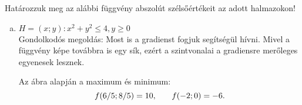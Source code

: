 \documentclass[exercise]{math-standalone}
\begin{document}
\begin{exercise}{%
    Határozzuk meg az alábbi függvény abszolút szélsőértékeit az adott
    halmazokon!
  }
{\begin{enumerate}[a)]
            Számolósabb megoldás: Lagrange-multiplikátor segítségével.
            Ekkor az alábbi függvénynek keressük a szélsőértékeit:
            \[
              F(x; y; \lambda) = 3x + 4y + \lambda (x^2 + y^2 - 4)
            \]
            Határozzuk meg a parciális deriváltakat:
            \[
              \pdv{F}{x} = 3 + 2x \lambda = 0
              \text, \qquad
              \pdv{F}{y} = 4 + 2y \lambda = 0
              \text, \qquad
              \pdv{F}{\lambda} = x^2 + y^2 - 4 = 0
              \text.
            \]
            Az első és a második egyenlet alapján:
            \[
              x = \frac{-3}{2\lambda}
              \text, \qquad
              y = \frac{-4}{2\lambda}
              \text.
            \]
            Ezek segítségével a harmadik egyenlet:
            \[
              \frac{9}{4\lambda^2} + \frac{16}{4\lambda^2} - 4 = 0
              \quad \rightarrow \quad
              \lambda_{12} = \pm \frac{5}{4}
              \text.
            \]
            A keresett pontok tehát:
            \[
              (x_1; y_1) = (6/5; 8/5)
              \text, \qquad
              (x_2; y_2) = (-6/5; -8/5)
              \text.
            \]
            A függvényértékek pedig:
            \[
              f(6/5; 8/5) = 10
              \text,\qquad
              f(-6/5; -8/5) = -10
              \text.
            \]
            Látható, hogy ezzel a módszerrel is ugyan azt a megoldást kaptuk.

      \item $H = {(x;y) : x^2 + y^2 \leq 4, y \geq 0}$\\[2mm]
            Gondolkodós megoldás: Most is a gradienst fogjuk segítségül hívni.
            Mivel a függvény képe továbbra is egy sík, ezért a szintvonalai a
            gradiensre merőleges egyenesek lesznek.
            \begin{center}
            \end{center}
            Az ábra alapján a maximum és minimum:
            \[
              f(6/5; 8/5) = 10
              \text,\qquad
              f(-2; 0) = -6
              \text.
            \]


\end{enumerate}}
\end{exercise}
\end{document}

